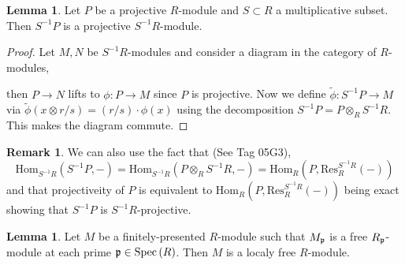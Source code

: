 \documentclass[12pt]{extarticle}
\newcommand{\Hom}[3]{\mathrm{Hom}_{#1}\left( #2, #3 \right)}
\theoremstyle{definition}
\newtheorem{lemma}[theorem]{Lemma}
\newtheorem{remark}{Remark}
\begin{document}
\begin{lemma}
Let $P$ be a projective $R$-module and $S \subset R$ a multiplicative subset. Then $S^{-1} P$ is a projective $S^{-1} R$-module.
\end{lemma}

\begin{proof}
Let $M, N$ be $S^{-1} R$-modules and consider a diagram in the category of $R$-modules,
\begin{center}
\end{center}
then $P \to N$ lifts to $\phi : P \to M$ since $P$ is projective. Now we define $\tilde{\phi} : S^{-1} P \to M$ via $\tilde{\phi}(x \otimes r/s) = (r/s) \cdot \phi(x)$ using the decomposition $S^{-1} P = P \otimes_R S^{-1} R$. This makes the diagram commute. 
\end{proof}

\begin{remark}
We can also use the fact that (See Tag 05G3),
\[ \Hom{S^{-1} R}{S^{-1} P}{-} = \Hom{S^{-1} R}{P \otimes_R S^{-1} R}{-} = \Hom{R}{P}{\mathrm{Res}^{S^{-1} R}_{R} (-)} \]
and that projectiveity of $P$ is equivalent to $\Hom{R}{P}{\mathrm{Res}^{S^{-1} R}_{R} (-)}$ being exact showing that $S^{-1} P$ is $S^{-1} R$-projective.
\end{remark}

\begin{lemma}
Let $M$ be a finitely-presented $R$-module such that $M_{\mathfrak{p}}$ is a free $R_{\mathfrak{p}}$-module at each prime $\mathfrak{p} \in \mathrm{Spec}\left(R\right)$. Then $M$ is a localy free $R$-module.
\end{lemma}
\end{document}
